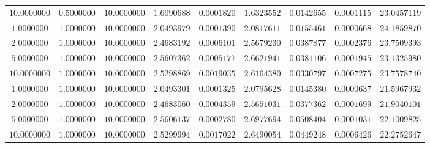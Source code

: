 \begin{tabular}{ccccccccc}
$10.0000000$ & $0.5000000$ & $10.0000000$ & $1.6090688$ & $0.0001820$ & $1.6323552$ & $0.0142655$ & $0.0001115$ & $23.0457119$\\
$1.0000000$ & $1.0000000$ & $10.0000000$ & $2.0493979$ & $0.0001390$ & $2.0817611$ & $0.0155461$ & $0.0000668$ & $24.1859870$\\
$2.0000000$ & $1.0000000$ & $10.0000000$ & $2.4683192$ & $0.0006101$ & $2.5679230$ & $0.0387877$ & $0.0002376$ & $23.7509393$\\
$5.0000000$ & $1.0000000$ & $10.0000000$ & $2.5607362$ & $0.0005177$ & $2.6621941$ & $0.0381106$ & $0.0001945$ & $23.1325980$\\
$10.0000000$ & $1.0000000$ & $10.0000000$ & $2.5298869$ & $0.0019035$ & $2.6164380$ & $0.0330797$ & $0.0007275$ & $23.7578740$\\
$1.0000000$ & $1.0000000$ & $10.0000000$ & $2.0493301$ & $0.0001325$ & $2.0795628$ & $0.0145380$ & $0.0000637$ & $21.5967932$\\
$2.0000000$ & $1.0000000$ & $10.0000000$ & $2.4683060$ & $0.0004359$ & $2.5651031$ & $0.0377362$ & $0.0001699$ & $21.9040101$\\
$5.0000000$ & $1.0000000$ & $10.0000000$ & $2.5606137$ & $0.0002780$ & $2.6977694$ & $0.0508404$ & $0.0001031$ & $22.1009825$\\
$10.0000000$ & $1.0000000$ & $10.0000000$ & $2.5299994$ & $0.0017022$ & $2.6490054$ & $0.0449248$ & $0.0006426$ & $22.2752647$\\
\end{tabular}
